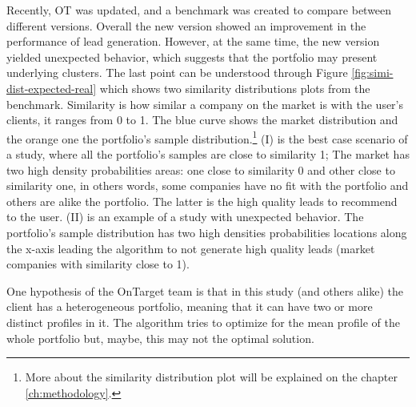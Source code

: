 Recently, OT was updated, and a benchmark was created to compare between different versions. Overall the new version showed an improvement in the performance of lead generation. However, at the same time, the new version yielded unexpected behavior, which suggests that the portfolio may present underlying clusters. The last point can be understood through Figure \ref{fig:simi-dist-expected-real} which shows two similarity distributions plots from the benchmark. Similarity is how similar a company on the market is with the user's clients, it ranges from 0 to 1. The blue curve shows the market distribution and the orange one the portfolio's sample distribution.\footnote{More about the similarity distribution plot will be explained on the chapter \ref{ch:methodology}.}
(I) is the best case scenario of a study, where all the portfolio's samples are close to similarity 1; The market has two high density probabilities areas: one close to similarity 0 and other close to similarity one, in others words, some companies have no fit with the portfolio and others are alike the portfolio. The latter is the high quality leads to recommend to the user. (II) is an example of a study with unexpected behavior. The portfolio's sample distribution has two high densities probabilities locations along the x-axis leading the algorithm to not generate high quality leads (market companies with similarity close to 1).

One hypothesis of the OnTarget team is that in this study (and others alike) the client has a heterogeneous portfolio, meaning that it can have two or more distinct profiles in it. The algorithm tries to optimize for the mean profile of the whole portfolio but, maybe, this may not the optimal solution.

